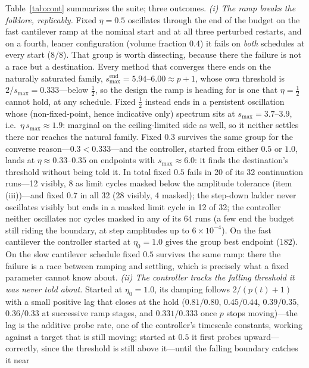 \documentclass[11pt,a4paper]{article}
\newcommand{\smax}{s_{\max}}
\begin{document}
Table~\ref{tab:cont} summarizes the suite; three outcomes.
\emph{(i) The ramp breaks the folklore, replicably.} Fixed
$\eta=0.5$ oscillates through the end of the budget on the fast
cantilever ramp at the nominal start and at all three perturbed
restarts, and on a fourth, leaner configuration (volume fraction
$0.4$) it fails on \emph{both} schedules at every start (8/8). That
group is worth dissecting, because there the failure is not a race but
a destination. Every method that converges there ends on the naturally
saturated family, $\smax^{\mathrm{end}}=5.94$--$6.00\approx p{+}1$,
whose own threshold is $2/\smax=0.333$---below $\tfrac12$, so the
design the ramp is heading for is one that $\eta=\tfrac12$ cannot hold,
at any schedule. Fixed $\tfrac12$ instead ends in a persistent
oscillation whose (non-fixed-point, hence indicative only) spectrum
sits at $\smax=3.7$--$3.9$, i.e.\ $\eta\,\smax\approx1.9$: marginal on
the ceiling-limited side as well, so it neither settles there nor
reaches the natural family. Fixed $0.3$ survives the same group for the
converse reason---$0.3<0.333$---and the controller, started from either
$0.5$ or $1.0$, lands at $\eta\approx0.33$--$0.35$ on endpoints with
$\smax\approx6.0$: it finds the destination's threshold without being
told it. In total fixed $0.5$ fails in 20 of its 32 continuation
runs---12 visibly, 8 as limit cycles masked below the amplitude
tolerance (item (iii))---and fixed $0.7$ in all 32 (28 visibly, 4
masked); the step-down ladder never oscillates visibly but ends in a
masked limit cycle in 12 of 32; the controller neither oscillates nor
cycles masked in any of its 64 runs (a few end the budget still riding
the boundary, at step amplitudes up to $6\times10^{-4}$). On the fast
cantilever the controller started at $\eta_0=1.0$ gives the group best
endpoint ($182$). On the slow
cantilever schedule fixed $0.5$ survives the same ramp: there the
failure is a race between ramping and settling, which is precisely
what a fixed parameter cannot know about. \emph{(ii) The controller tracks the falling
threshold it was never told about.} Started at $\eta_0=1.0$, its damping
follows $2/(p(t){+}1)$ with a small positive lag that closes at the
hold ($0.81/0.80$, $0.45/0.44$, $0.39/0.35$, $0.36/0.33$ at successive
ramp stages, and $0.331/0.333$ once $p$ stops moving)---the lag is the
additive probe rate, one of the controller's timescale constants,
working against a target that is still moving; started at $0.5$ it first probes upward---correctly, since the
threshold is still above it---until the falling boundary catches it near
\end{document}
